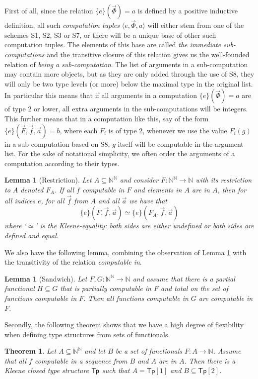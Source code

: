 \documentclass[reqno]{amsart}
\newtheorem{theorem}[thm]{Theorem}
\newtheorem{lemma}[thm]{Lemma}
\def\N{{\mathbb  N}}
\def\TP{\textup{\textsf{Tp}}}
\newcommand{\Tp}{\mathsf{Tp}}
\numberwithin{equation}{section}
\numberwithin{thm}{section}
\begin{document}
First of all, since the relation $\{e\}(\vec \Phi) = a$ is defined by a positive inductive definition, all such \emph{computation tuples} $\langle e , \vec \Phi , a \rangle$ will either stem from one of the schemes S1, S2, S3 or S7, or there will be a unique base of other such computation tuples. The elements of this base are called \emph{the immediate sub-computations} and the transitive closure of this relation gives us the well-founded relation of \emph{being a sub-computation}. The list of arguments in a sub-computation may contain more objects, but as they are only added through the use of S8, they will only be two type levels (or more) below the maximal type in the original list. In particular this means that if all arguments in a computation $\{e\}(\vec \Phi) = a$ are of type 2 or lower, all extra arguments in the sub-computations will be integers. This further means that in a computation like this, say of the form $\{e\}(\vec F , \vec f , \vec a) = b$, where each $F_i$ is of type 2, whenever we use the value  $F_i(g)$ in a sub-computation based on S8, $g$ itself will be computable in the argument list.  
For the sake of notational simplicity, we often order the arguments of a computation according to their types.  %
\begin{lemma}[Restriction] \label{lemma.absolute}
 Let $A \subseteq  \N^\N$ and consider $F:\N^\N \rightarrow \N$ with its restriction to $A$ denoted $F_A$. If all $f$ computable in $F$ and elements in $A$ are in $A$, then for all indices $e$, for all $\vec f$ from $A$ and all $\vec a$ we have that \[\{e\}(F,\vec f , \vec a) \simeq \{e\}(F_A , \vec f , \vec a)\] where `$\simeq$' is the \emph{Kleene-equality}: both sides are either undefined or both sides are defined and equal.
 \end{lemma}
We also have the following lemma, combining the observation of Lemma \ref{lemma.absolute} with the transitivity of the relation \emph{computable in}.
\begin{lemma}[Sandwich]\label{lemma.blowout} 
Let $F,G:\N^\N \rightarrow \N$ and assume that there is a partial functional $H \subseteq G$ that is partially computable in $F$ and total on the set of functions computable in $F$. 
Then all functions computable in $G$ are computable in $F$. 
\end{lemma}
Secondly, the following theorem shows that we have a high degree of flexibility when defining type structures from sets of functionals. 
\begin{theorem}\label{thm.ext} 
Let $A \subseteq \N^\N$ and let $B$ be a set of functionals $F:A \rightarrow \N$. 
Assume that all $f$ computable in a sequence from $B$ and $A$  are in $A$. 
Then there is a Kleene closed type structure $\TP$ such that $A = \Tp[1]$ and $B \subseteq \Tp[2]$.
\end{theorem}
\end{document}
